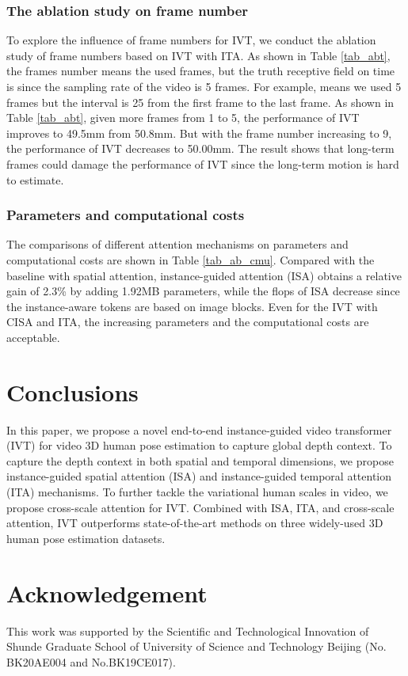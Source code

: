 \documentclass[sigconf]{acmart}
\begin{document}
\subsubsection{The ablation study on frame number}
To explore the influence of frame numbers for IVT, we conduct the ablation study of frame numbers based on IVT with ITA. As shown in Table \ref{tab_abt}, the frames number means the used frames, but the truth receptive field on time is  since the sampling rate of the video is 5 frames. For example,  means we used 5 frames but the interval is 25 from the first frame to the last frame. As shown in Table \ref{tab_abt}, given more frames from 1 to 5, the performance of IVT improves to 49.5mm from 50.8mm. But with the frame number increasing to 9, the performance of IVT decreases to 50.00mm. The result shows that long-term frames could damage the performance of IVT since the long-term motion is hard to estimate.

\subsubsection{Parameters and computational costs}

The comparisons of different attention mechanisms on parameters and computational costs are shown in Table \ref{tab_ab_cmu}. Compared with the baseline with spatial attention, instance-guided attention (ISA) obtains a relative gain of 2.3\% by adding 1.92MB parameters, while the flops of ISA decrease since the instance-aware tokens are based on image blocks. Even for the IVT with CISA and ITA, the increasing parameters and the computational costs are acceptable.

\section{Conclusions}
In this paper, we propose a novel end-to-end instance-guided video transformer (IVT) for video 3D human pose estimation to capture global depth context.
To capture the depth context in both spatial and temporal dimensions, we propose instance-guided spatial attention (ISA) and instance-guided temporal attention (ITA) mechanisms. To further tackle the variational human scales in video, we propose cross-scale attention for IVT. Combined with ISA, ITA, and cross-scale attention, IVT outperforms state-of-the-art methods on three widely-used 3D human pose estimation datasets.

\section{Acknowledgement}
This work was supported by the Scientific and Technological Innovation of Shunde Graduate School of University of Science and Technology Beijing (No. BK20AE004 and No.BK19CE017).

\clearpage


\end{document}
